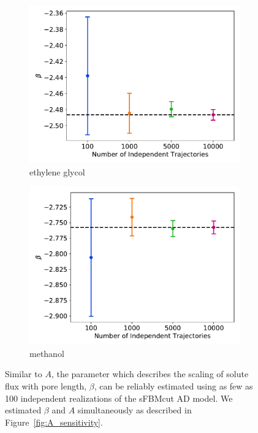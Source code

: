 \documentclass{article}
\begin{document}
\begin{figure}
\begin{subfigure}{0.45\textwidth}
  \includegraphics[width=\textwidth]{flux_curves_betasensitivity_GCL.pdf}
  \caption{ethylene glycol}\label{fig:betasensitivity_GCL}
  \end{subfigure}
  \begin{subfigure}{0.45\textwidth}
  \includegraphics[width=\textwidth]{flux_curves_betasensitivity_MET.pdf}
  \caption{methanol}\label{fig:betasensitivity_MET}
  \end{subfigure}
  \caption{Similar to $A$, the parameter which describes the scaling of solute
  flux with pore length, $\beta$, can be reliably estimated using as few as 100
  independent realizations of the sFBMcut AD model. We estimated $\beta$ and
  $A$ simultaneously as described in Figure~\ref{fig:A_sensitivity}.
  }\label{fig:beta_sensitivity}
  \end{figure}
  
\end{document}
